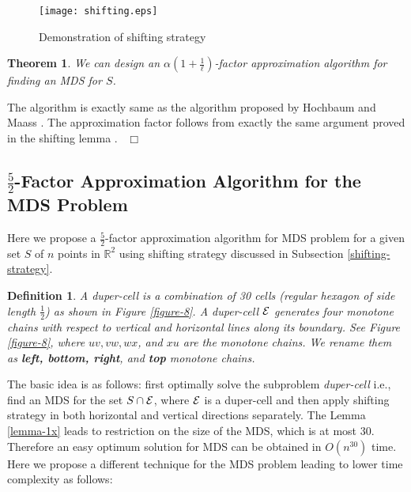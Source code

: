\documentclass[a4paper,11pt]{article}
\newcommand{\IR}{\mathbb{R}}
\newtheorem{theorem}{Theorem}
\newtheorem{definition}{Definition}
\newenvironment{proof}{\noindent {\bf Proof:\,\ }}{\hfill\mbox{\
$\Box$}\smallskip}
\begin{document}
\begin{figure*}[!ht]
\begin{center}
\texttt{[image: shifting.eps]}
\end{center} 
\caption{Demonstration of shifting strategy}
\label{shifting}
\end{figure*}

\begin{theorem} \label{shift-factor}
We can design an $\alpha(1+\frac{1}{\ell})$-factor approximation algorithm for finding an MDS for $S$.
\end{theorem}

\begin{proof}
The algorithm is exactly same as the algorithm proposed by Hochbaum and Maass \cite{HM85}. The approximation factor 
follows from exactly the same argument proved in the shifting lemma \cite{HM85}. 
\end{proof}


\subsection{$\frac{5}{2}$-Factor Approximation Algorithm for the MDS Problem}
Here we propose a $\frac{5}{2}$-factor approximation algorithm for MDS problem for a given 
set $S$ of $n$ points in $\IR^2$ using shifting strategy discussed in Subsection \ref{shifting-strategy}. 

\begin{definition}
 A {\it duper-cell} is a combination of 30 cells (regular hexagon of side length $\frac{1}{2}$) as shown in 
 Figure \ref{figure-8}. A duper-cell ${\cal E}$ generates four monotone chains with respect to 
 vertical and horizontal lines along its boundary. See Figure \ref{figure-8}, where $uv, vw, wx$, and $xu$ 
 are the monotone chains. We rename them as {\bf left, bottom, right}, and {\bf top} monotone chains.
\end{definition}

The basic idea is as follows: first optimally solve the subproblem {\it duper-cell} i.e., 
find an MDS for the set $S \cap {\cal E}$, where ${\cal E}$ is a duper-cell and then apply shifting 
strategy in both horizontal and vertical directions separately. The Lemma \ref{lemma-1x} leads 
to restriction on the size of the MDS, which is at most 30. Therefore an easy optimum solution 
for MDS can be obtained in $O(n^{30})$ time. Here we propose a different technique for the MDS problem 
leading to lower time complexity as follows:
\end{document}
